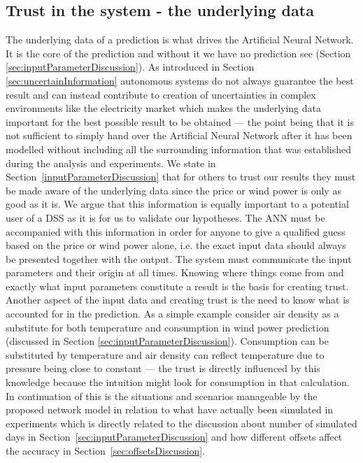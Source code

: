 \subsection{Trust in the system - the underlying data}
The underlying data of a prediction is what drives the Artificial Neural Network. It is the core of the prediction and without it we have no prediction see (Section \ref{sec:inputParameterDiscussion}). As introduced in Section \ref{sec:uncertainInformation} autonomous systems do not always guarantee the best result and can instead contribute to creation of uncertainties in complex environments like the electricity market which makes the underlying data important for the best possible result to be obtained --- the point being that it is not sufficient to simply hand over the Artificial Neural Network after it has been modelled without including all the surrounding information that was established during the analysis and experiments. We state in Section~\ref{inputParameterDiscussion} that for others to trust our results they must be made aware of the underlying data since the price or wind power is only as good as it is. We argue that this information is equally important to a potential user of a DSS as it is for us to validate our hypotheses. The ANN must be accompanied with this information in order for anyone to give a qualified guess based on the price or wind power alone, i.e. the exact input data should always be presented together with the output. The system must communicate the input parameters and their origin at all times. Knowing where things come from and exactly what input parameters constitute a result is the basis for creating trust. Another aspect of the input data and creating trust is the need to know what is accounted for in the prediction. As a simple example consider air density as a substitute for both temperature and consumption in wind power prediction (discussed in Section \ref{sec:inputParameterDiscussion}). Consumption can be substituted by temperature and air density can reflect temperature due to pressure being close to constant --- the trust is directly influenced by this knowledge because the intuition might look for consumption in that calculation. In continuation of this is the situations and scenarios manageable by the proposed network model in relation to what have actually been simulated in experiments which is directly related to the discussion about number of simulated days in Section~\ref{sec:inputParameterDiscussion} and how different offsets affect the accuracy in Section~\ref{sec:offsetsDiscussion}. 
 
